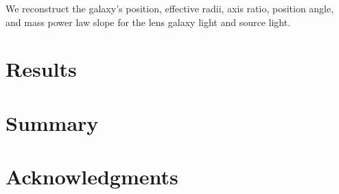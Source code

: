 \documentclass[a4paper,11pt]{article}
\begin{document}
We reconstruct the galaxy's position, effective radii, axis ratio, position angle, and mass power law slope for the lens galaxy light and source light. 

\section{Results}

\section{Summary}

\section*{Acknowledgments}









\end{document}
